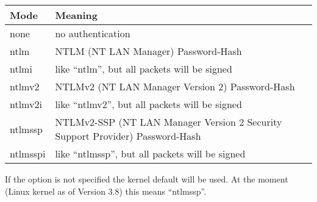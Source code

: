 \begin{description}
  \begin{tabular}{|p{1.5cm}|p{11.5cm}|}
    \hline
    Mode & Meaning \\
    \hline
    none & no authentication \\
    ntlm & NTLM (NT LAN Manager) Password-Hash \\
    ntlmi & like ``ntlm'', but all packets will be signed \\
    ntlmv2 & NTLMv2 (NT LAN Manager Version 2) Password-Hash \\
    ntlmv2i & like ``ntlmv2'', but all packets will be signed \\
    ntlmssp & NTLMv2-SSP (NT LAN Manager Version 2 Security Support Provider) Password-Hash \\
    ntlmsspi & like ``ntlmssp'', but all packets will be signed \\
    \hline
  \end{tabular}

  If the option is not specified the kernel default will be used. At the moment
  (Linux kernel as of Version 3.8) this means ``ntlmssp''.


\end{description}
